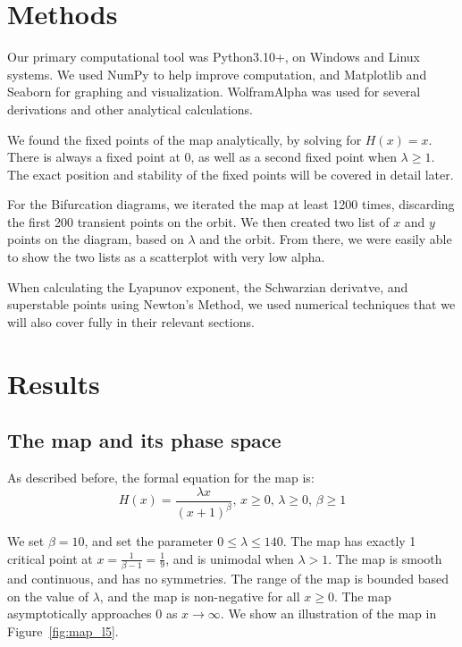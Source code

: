 \documentclass[12pt]{article}
\begin{document}
\section{Methods}

Our primary computational tool was Python3.10+, on Windows and Linux systems. We used NumPy to help improve computation, and Matplotlib and Seaborn for graphing and visualization. WolframAlpha was used for several derivations and other analytical calculations.

We found the fixed points of the map analytically, by solving for $H(x) = x$. There is always a fixed point at $0$, as well as a second fixed point when $\lambda \geq 1$. The exact position and stability of the fixed points will be covered in detail later.

For the Bifurcation diagrams, we iterated the map at least 1200 times, discarding the first 200 transient points on the orbit. We then created two list of $x$ and $y$ points on the diagram, based on $\lambda$ and the orbit. From there, we were easily able to show the two lists as a scatterplot with very low alpha.

When calculating the Lyapunov exponent, the Schwarzian derivatve, and superstable points using Newton's Method, we used numerical techniques that we will also cover fully in their relevant sections.

\section{Results}

\subsection{The map and its phase space}

As described before, the formal equation for the map is:$$H(x) = \frac{\lambda x}{\left( x + 1 \right)^\beta}, \, x \geq 0, \, \lambda \geq 0, \, \beta \geq 1$$

We set $\beta = 10$, and set the parameter $0 \leq \lambda \leq 140$. The map has exactly 1 critical point at $x = \frac{1}{\beta - 1} = \frac{1}{9}$, and is unimodal when $\lambda > 1$. The map is smooth and continuous, and has no symmetries. The range of the map is bounded based on the value of $\lambda$, and the map is non-negative for all $x \geq 0$. The map asymptotically approaches $0$ as $x \to \infty$. We show an illustration of the map in Figure~\ref{fig:map_l5}.
\end{document}
